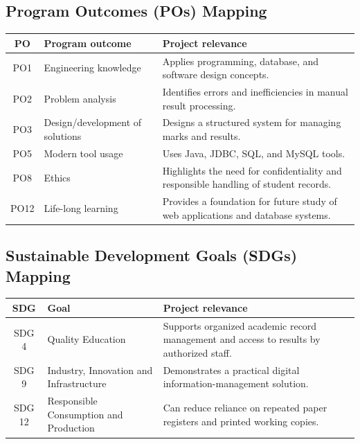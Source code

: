 \documentclass[11pt,a4paper]{report}
\begin{document}
\subsection{Program Outcomes (POs) Mapping}
\begin{center}
\small
\begin{tabular}{|c|p{5.1cm}|p{7cm}|}\hline
\textbf{PO} & \textbf{Program outcome} & \textbf{Project relevance}\\\hline
PO1 & Engineering knowledge & Applies programming, database, and software design concepts.\\\hline
PO2 & Problem analysis & Identifies errors and inefficiencies in manual result processing.\\\hline
PO3 & Design/development of solutions & Designs a structured system for managing marks and results.\\\hline
PO5 & Modern tool usage & Uses Java, JDBC, SQL, and MySQL tools.\\\hline
PO8 & Ethics & Highlights the need for confidentiality and responsible handling of student records.\\\hline
PO12 & Life-long learning & Provides a foundation for future study of web applications and database systems.\\\hline
\end{tabular}
\end{center}

\subsection{Sustainable Development Goals (SDGs) Mapping}
\begin{center}
\small
\begin{tabular}{|c|p{5cm}|p{7cm}|}\hline
\textbf{SDG} & \textbf{Goal} & \textbf{Project relevance}\\\hline
SDG 4 & Quality Education & Supports organized academic record management and access to results by authorized staff.\\\hline
SDG 9 & Industry, Innovation and Infrastructure & Demonstrates a practical digital information-management solution.\\\hline
SDG 12 & Responsible Consumption and Production & Can reduce reliance on repeated paper registers and printed working copies.\\\hline
\end{tabular}
\end{center}
\end{document}
